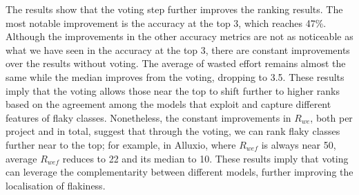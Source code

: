The results show that the voting step further improves the ranking results.
The most notable improvement is the accuracy at the top 3, which reaches 47\%. Although the improvements in the other accuracy metrics are not as noticeable as what we have seen in the accuracy at the top 3, there are constant improvements over the results without voting. 
The average of wasted effort remains almost the same while the median improves from the voting, dropping to 3.5. These results imply that the voting allows those near the top to shift further to higher ranks based on the agreement among the models that exploit and capture different features of flaky classes.
Nonetheless, the constant improvements in $R_{we}$, both per project and in total, suggest that through the voting, we can rank flaky classes further near to the top; for example, in Alluxio, where $R_{wef}$ is always near 50, average $R_{wef}$ reduces to 22 and its median to 10. 
These results imply that voting can leverage the complementarity between different models, further improving the localisation of flakiness.


